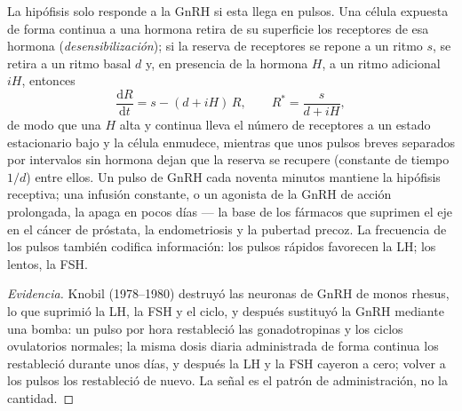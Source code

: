 \begin{proposition}\label{prop:b2:reproductive-hormones:pulses}
La hipófisis solo responde a la GnRH si esta llega en pulsos. Una célula
expuesta de forma continua a una hormona retira de su superficie los
receptores de esa hormona (\emph{desensibilización}); si la reserva de
receptores se repone a un ritmo $s$, se retira a un ritmo basal $d$ y, en
presencia de la hormona $H$, a un ritmo adicional $iH$, entonces
\[
\frac{\mathrm{d}R}{\mathrm{d}t} = s - (d + iH)\,R, \qquad R^* = \frac{s}{d + iH},
\]
de modo que una $H$ alta y continua lleva el número de receptores a un
estado estacionario bajo y la célula enmudece, mientras que unos pulsos
breves separados por intervalos sin hormona dejan que la reserva se
recupere (constante de tiempo $1/d$) entre ellos. Un pulso de GnRH cada
noventa minutos mantiene la hipófisis receptiva; una infusión constante,
o un agonista de la GnRH de acción prolongada, la apaga en pocos días ---
la base de los fármacos que suprimen el eje en el cáncer de próstata, la
endometriosis y la pubertad precoz. La frecuencia de los pulsos también
codifica información: los pulsos rápidos favorecen la LH; los lentos, la
FSH.
\end{proposition}
\begin{proof}[Evidencia]
Knobil (1978--1980) destruyó las neuronas de GnRH de monos rhesus, lo que
suprimió la LH, la FSH y el ciclo, y después sustituyó la GnRH mediante
una bomba: un pulso por hora restableció las gonadotropinas y los ciclos
ovulatorios normales; la misma dosis diaria administrada de forma
continua los restableció durante unos días, y después la LH y la FSH
cayeron a cero; volver a los pulsos los restableció de nuevo. La señal es
el patrón de administración, no la cantidad.
\end{proof}

